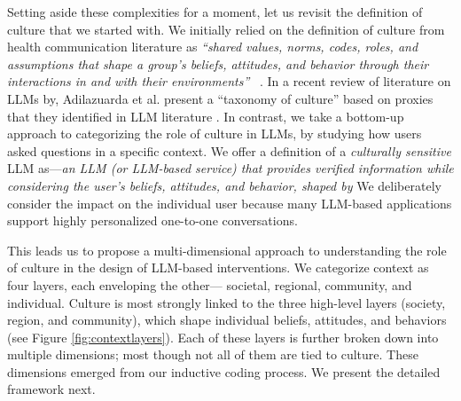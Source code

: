 Setting aside these complexities for a moment, let us revisit the definition of culture that we started with. We initially relied on the definition of culture from health communication literature as \textit{``shared values, norms, codes, roles, and assumptions that shape a group's beliefs, attitudes, and behavior through their interactions in and with their environments''} ~\cite{griffith2024cultural}. 
In a recent review of literature on LLMs by, Adilazuarda et al. present a ``taxonomy of culture'' based on proxies that they identified in LLM literature  \cite{adilazuarda2024measuringmodelingculturellms}. In contrast, we take a bottom-up approach to categorizing the role of culture in LLMs, by studying how users asked questions in a specific context.
We offer a definition of a \textit{culturally sensitive} LLM as---\textit{an LLM (or LLM-based service) that provides verified  information while considering the user's beliefs, attitudes, and behavior, shaped by  }
We deliberately consider the impact on the individual user  because many LLM-based applications support highly personalized one-to-one conversations.


This leads us to propose a multi-dimensional approach to understanding the role of culture in the design of LLM-based interventions. We categorize context as four layers, each enveloping the other--- societal, regional, community, and individual. 
Culture is most strongly linked to the three high-level layers (society, region, and community), which shape individual beliefs, attitudes, and behaviors (see Figure \ref{fig:contextlayers}).
Each of these layers is further broken down into multiple dimensions; most though not all of them are tied to culture. These dimensions emerged from our inductive coding process.
We present the detailed framework next.

